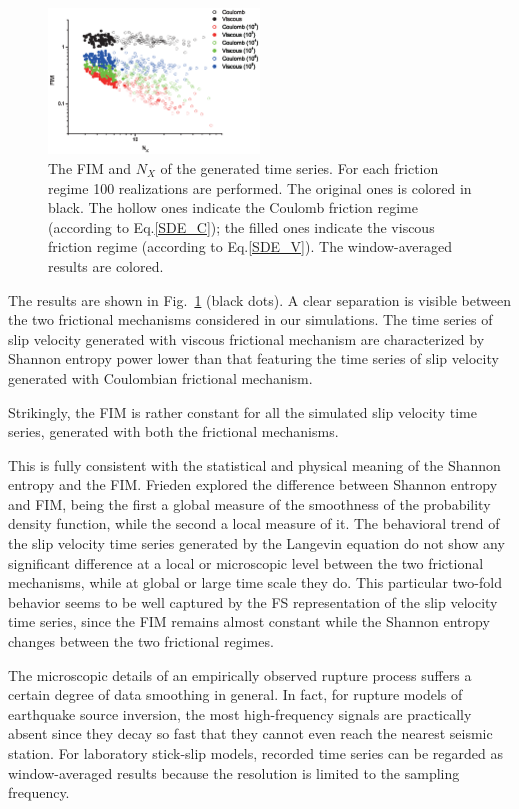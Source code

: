 \documentclass[%
 aip,
rsi,%
 amsmath,amssymb,
 reprint,%
]{revtex4-1}
\begin{document}
\begin{figure}
    \includegraphics[width=0.5\textwidth]{Fig_winAvg.eps}%
    \caption{\label{fig_smth} The FIM and $N_X$ of the generated time series. For each friction regime 100 realizations are performed. The original ones is colored in black. The hollow ones indicate the Coulomb friction regime (according to Eq.\ref{SDE_C}); the filled ones indicate the viscous friction regime (according to Eq.\ref{SDE_V}). The  window-averaged results are colored.}
\end{figure}

The results are shown in Fig.~\ref{fig_smth} (black dots). A clear separation is visible between the two frictional mechanisms considered in our simulations. The time series of slip velocity generated with viscous frictional mechanism are characterized by Shannon entropy power lower than that featuring the time series of slip velocity generated with Coulombian frictional mechanism.

Strikingly, the FIM is rather constant for all the simulated slip velocity time series, generated with both the frictional mechanisms.

This is fully consistent with the statistical and physical meaning of the Shannon entropy and the FIM. Frieden\cite{frieden_physics_1998} explored the difference between Shannon entropy and FIM, being the first a global measure of the smoothness of the probability density function, while the second a local measure of it. The behavioral trend of the slip velocity time series generated by the Langevin equation do not show any significant difference at a local or microscopic level between the two frictional mechanisms, while at global or large time scale they do. This particular two-fold behavior seems to be well captured by the FS representation of the slip velocity time series, since the FIM remains almost constant while the Shannon entropy changes between the two frictional regimes.

The microscopic details of an empirically observed rupture process suffers a certain degree of data smoothing in general. In fact, for rupture models of earthquake source inversion, the most high-frequency signals are practically absent since they decay so fast that they cannot even reach the nearest seismic station. For laboratory stick-slip models, recorded time series can be regarded as  window-averaged results because the resolution is limited to the sampling frequency.
\end{document}
